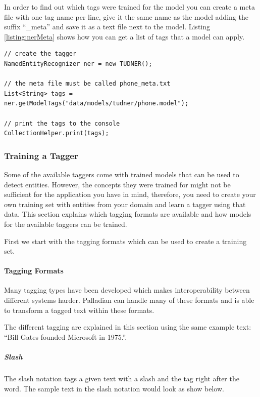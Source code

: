 In order to find out which tags were trained for the model you can create a meta file with one tag name per line, give it the same name as the model adding the suffix ``\_meta'' and save it as a text file next to the model. Listing \ref{listing:nerMeta} shows how you can get a list of tags that a model can apply.

\begin{codelisting}
\begin{lstlisting}[label=listing:nerMeta,caption=Reading a model's meta data.,frame=tb]
// create the tagger
NamedEntityRecognizer ner = new TUDNER();

// the meta file must be called phone_meta.txt
List<String> tags = ner.getModelTags("data/models/tudner/phone.model");

// print the tags to the console
CollectionHelper.print(tags);
\end{lstlisting}
\end{codelisting}

\subsubsection{Training a Tagger}

Some of the available taggers come with trained models that can be used to detect entities. However, the concepts they were trained for might not be sufficient for the application you have in mind, therefore, you need to create your own training set with entities from your domain and learn a tagger using that data. This section explains which tagging formats are available and how models for the available taggers can be trained.

First we start with the tagging formats which can be used to create a training set.

\paragraph{Tagging Formats}
Many tagging types have been developed which makes interoperability between different systems harder. Palladian can handle many of these formats and is able to transform a tagged text within these formats. 

The different tagging are explained in this section using the same example text: ``Bill Gates founded Microsoft in 1975.''.

\subparagraph{Slash} The slash notation tags a given text with a slash and the tag right after the word. The sample text in the slash notation would look as show below.

